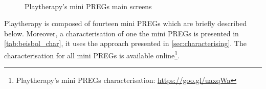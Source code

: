 \begin{figure}[bth]
\centering
{}
\\
\caption{Playtherapy's mini \acp{PREG} main screens}
\label{fig:platherapy_screens}
\end{figure}

Playtherapy is composed of fourteen mini \acp{PREG} which are briefly described below. Moreover, a characterisation of one the mini \acp{PREG} is presented in \autoref{tab:beisbol_char}, it uses the approach presented in \autoref{sec:characterising}. The characterisation for all mini \acp{PREG} is available online\footnote{Playtherapy's mini \acp{PREG} characterisation: \url{https://goo.gl/uaxqWa}}.

